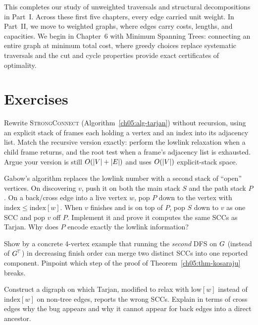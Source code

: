 This completes our study of unweighted traversals and structural decompositions in Part~I. Across these first five chapters, every edge carried unit weight. In Part~II, we move to weighted graphs, where edges carry costs, lengths, and capacities. We begin in Chapter~6 with Minimum Spanning Trees: connecting an entire graph at minimum total cost, where greedy choices replace systematic traversals and the cut and cycle properties provide exact certificates of optimality.

\section{Exercises}
\label{ch05:exercises}

\begin{exercise}
Rewrite \textsc{StrongConnect} (Algorithm~\ref{ch05:alg-tarjan}) without recursion, using an explicit stack of frames each holding a vertex and an index into its adjacency list. Match the recursive version exactly: perform the lowlink relaxation when a child frame returns, and the root test when a frame's adjacency list is exhausted. Argue your version is still $O(\lvert V\rvert+\lvert E\rvert)$ and uses $O(\lvert V\rvert)$ explicit-stack space.
\end{exercise}

\begin{exercise}
Gabow's algorithm replaces the lowlink number with a second stack of ``open'' vertices. On discovering $v$, push it on both the main stack $S$ and the path stack $P$. On a back/cross edge into a live vertex $w$, pop $P$ down to the vertex with $\mathrm{index}\le\mathrm{index}[w]$. When $v$ finishes and is on top of $P$, pop $S$ down to $v$ as one SCC and pop $v$ off $P$. Implement it and prove it computes the same SCCs as Tarjan. Why does $P$ encode exactly the lowlink information?
\end{exercise}

\begin{exercise}
Show by a concrete 4-vertex example that running the \emph{second} DFS on $G$ (instead of $G^{\!\top}$) in decreasing finish order can merge two distinct SCCs into one reported component. Pinpoint which step of the proof of Theorem~\ref{ch05:thm-kosaraju} breaks.
\end{exercise}

\begin{exercise}
Construct a digraph on which Tarjan, modified to relax with $\mathrm{low}[w]$ instead of $\mathrm{index}[w]$ on non-tree edges, reports the wrong SCCs. Explain in terms of cross edges why the bug appears and why it cannot appear for back edges into a direct ancestor.
\end{exercise}


